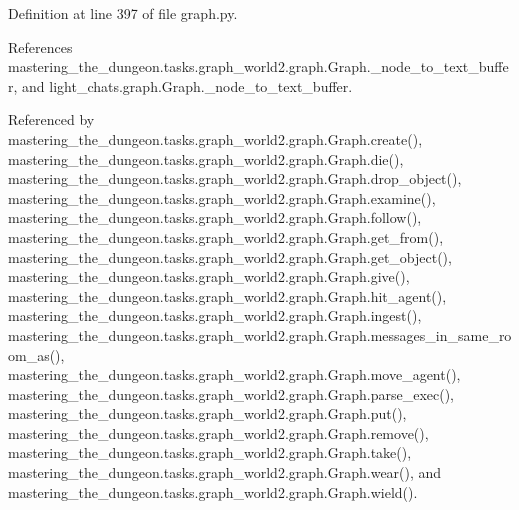 Definition at line 397 of file graph.\+py.



References mastering\+\_\+the\+\_\+dungeon.\+tasks.\+graph\+\_\+world2.\+graph.\+Graph.\+\_\+node\+\_\+to\+\_\+text\+\_\+buffer, and light\+\_\+chats.\+graph.\+Graph.\+\_\+node\+\_\+to\+\_\+text\+\_\+buffer.



Referenced by mastering\+\_\+the\+\_\+dungeon.\+tasks.\+graph\+\_\+world2.\+graph.\+Graph.\+create(), mastering\+\_\+the\+\_\+dungeon.\+tasks.\+graph\+\_\+world2.\+graph.\+Graph.\+die(), mastering\+\_\+the\+\_\+dungeon.\+tasks.\+graph\+\_\+world2.\+graph.\+Graph.\+drop\+\_\+object(), mastering\+\_\+the\+\_\+dungeon.\+tasks.\+graph\+\_\+world2.\+graph.\+Graph.\+examine(), mastering\+\_\+the\+\_\+dungeon.\+tasks.\+graph\+\_\+world2.\+graph.\+Graph.\+follow(), mastering\+\_\+the\+\_\+dungeon.\+tasks.\+graph\+\_\+world2.\+graph.\+Graph.\+get\+\_\+from(), mastering\+\_\+the\+\_\+dungeon.\+tasks.\+graph\+\_\+world2.\+graph.\+Graph.\+get\+\_\+object(), mastering\+\_\+the\+\_\+dungeon.\+tasks.\+graph\+\_\+world2.\+graph.\+Graph.\+give(), mastering\+\_\+the\+\_\+dungeon.\+tasks.\+graph\+\_\+world2.\+graph.\+Graph.\+hit\+\_\+agent(), mastering\+\_\+the\+\_\+dungeon.\+tasks.\+graph\+\_\+world2.\+graph.\+Graph.\+ingest(), mastering\+\_\+the\+\_\+dungeon.\+tasks.\+graph\+\_\+world2.\+graph.\+Graph.\+messages\+\_\+in\+\_\+same\+\_\+room\+\_\+as(), mastering\+\_\+the\+\_\+dungeon.\+tasks.\+graph\+\_\+world2.\+graph.\+Graph.\+move\+\_\+agent(), mastering\+\_\+the\+\_\+dungeon.\+tasks.\+graph\+\_\+world2.\+graph.\+Graph.\+parse\+\_\+exec(), mastering\+\_\+the\+\_\+dungeon.\+tasks.\+graph\+\_\+world2.\+graph.\+Graph.\+put(), mastering\+\_\+the\+\_\+dungeon.\+tasks.\+graph\+\_\+world2.\+graph.\+Graph.\+remove(), mastering\+\_\+the\+\_\+dungeon.\+tasks.\+graph\+\_\+world2.\+graph.\+Graph.\+take(), mastering\+\_\+the\+\_\+dungeon.\+tasks.\+graph\+\_\+world2.\+graph.\+Graph.\+wear(), and mastering\+\_\+the\+\_\+dungeon.\+tasks.\+graph\+\_\+world2.\+graph.\+Graph.\+wield().

